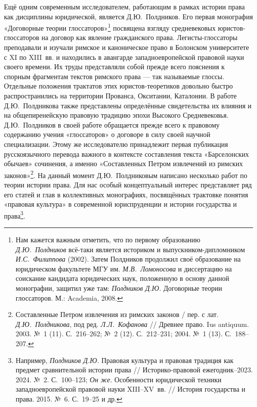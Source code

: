 Ещё одним современным исследователем, работающим в рамках истории права как дисциплины юридической, является Д.Ю.~Полдников. Его первая монография «Договорные теории глоссаторов»\footnote{Нам кажется важным отметить, что по первому образованию \emph{Д.Ю.~Полдников} всё-таки является историком и выпускником-дипломником \emph{И.С.~Филиппова} (2002). Затем Полдников продолжил своё образование на юридическом факультете МГУ им. \emph{М.В.~Ломоносова} и диссертацию на соискание кандидата юридических наук, положенную в основу данной монографии, защитил уже там: \emph{Полдников Д.Ю.} Договорные теории глоссаторов. М.: Academia, 2008.} посвящена взгляду средневековых юристов-глоссаторов на договор как явление гражданского права. Легисты-глоссаторы преподавали и изучали римское и каноническое право в Болонском университете с XI по XIII~вв. и находились в авангарде западноевропейской правовой науки своего времени. Их труды представляли собой прежде всего пояснения к спорным фрагментам текстов римского права --- так называемые глоссы. Отдельные положения трактатов этих юристов-теоретиков довольно быстро распространились на территории Прованса, Окситании, Каталонии. В работе Д.Ю.~Полдникова также представлены определённые свидетельства их влияния и на общепиренейскую правовую традицию эпохи Высокого Средневековья. Д.Ю.~Полдников в своей работе обращается прежде всего к правовому содержанию учения «глоссаторов» о договоре в силу своей научной специализации. Этому же исследователю принадлежит первая публикация русскоязычного перевода важного в контексте составления текста «Барселонских обычаев» сочинения, а именно «Составленных Петром извлечений из римских законов»\footnote{Составленные Петром извлечения из римских законов / пер. с лат. \emph{Д.Ю.~Полдникова}, под ред. \emph{Л.Л.~Кофанова} // Древнее право. Ius antiquum. 2003. №~1 (11). С.~216--262; №~2 (12). С.~212--231; 2004. №~1 (13). С.~188--207.}. На данный момент Д.Ю.~Полдниковым написано несколько работ по теории истории права. Для нас особый концептуальный интерес представляет ряд его статей и глав в коллективных монографиях, посвящённых трактовке понятия «правовая культура» в современной юриспруденции и истории государства и права\footnote{Например, \emph{Полдников Д.Ю. }Правовая культура и правовая традиция как предмет сравнительной истории права // Историко-правовой ежегодник--2023. 2024. №~2. С.~100--123; \emph{Он же.} Особенности юридической техники западноевропейской правовой науки XIII--XV~вв. // История государства и права. 2015. №~6. С.~19--25 и др.}.

